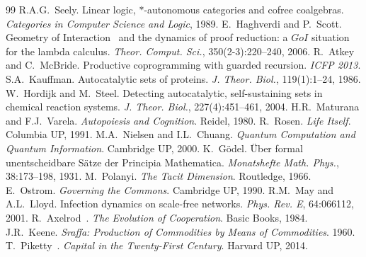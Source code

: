 \documentclass[11pt,a4paper]{article}
\begin{document}
\begin{thebibliography}{99}
 R.A.G.~Seely. Linear logic, $*$-autonomous categories and cofree coalgebras. \textit{Categories in Computer Science and Logic}, 1989.
 E.~Haghverdi and P.~Scott. Geometry of Interaction~\cite{girard89} and the dynamics of proof reduction: a $GoI$ situation for the lambda calculus. \textit{Theor. Comput. Sci.}, 350(2-3):220--240, 2006.
 R.~Atkey and C.~McBride. Productive coprogramming with guarded recursion. \textit{ICFP 2013}.
 S.A.~Kauffman. Autocatalytic sets of proteins. \textit{J. Theor. Biol.}, 119(1):1--24, 1986.
 W.~Hordijk and M.~Steel. Detecting autocatalytic, self-sustaining sets in chemical reaction systems. \textit{J. Theor. Biol.}, 227(4):451--461, 2004.
 H.R.~Maturana and F.J.~Varela. \textit{Autopoiesis and Cognition}. Reidel, 1980.
 R.~Rosen. \textit{Life Itself}. Columbia UP, 1991.
 M.A.~Nielsen and I.L.~Chuang. \textit{Quantum Computation and Quantum Information}. Cambridge UP, 2000.
 K.~G\"odel. \"Uber formal unentscheidbare S\"atze der Principia Mathematica. \textit{Monatshefte Math. Phys.}, 38:173--198, 1931.
 M.~Polanyi. \textit{The Tacit Dimension}. Routledge, 1966.
 E.~Ostrom. \textit{Governing the Commons}. Cambridge UP, 1990.
 R.M.~May and A.L.~Lloyd. Infection dynamics on scale-free networks. \textit{Phys. Rev. E}, 64:066112, 2001.
 R.~Axelrod~\cite{axelrod84}. \textit{The Evolution of Cooperation}. Basic Books, 1984.
 J.R.~Keene. \textit{Sraffa: Production of Commodities by Means of Commodities}. 1960.
 T.~Piketty~\cite{piketty14}. \textit{Capital in the Twenty-First Century}. Harvard UP, 2014.
\end{thebibliography}
\end{document}
